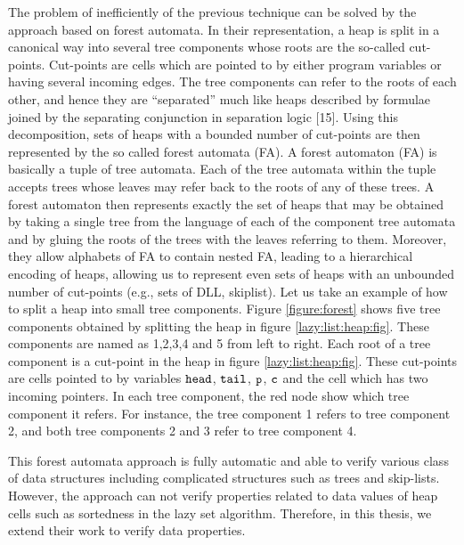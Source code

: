 The problem of inefficiently of the previous technique can be solved by the approach based on forest automata.  In their  representation, a heap is split in a canonical way into several tree components whose roots are the so-called cut-points. Cut-points are cells which are pointed to by either program variables or having several incoming edges. The tree components can refer to the roots of each other, and hence they are “separated” much like heaps described by formulae joined by the separating conjunction in separation logic [15].  Using this decomposition, sets of heaps with a bounded number of cut-points are then  represented by the  so called forest automata (FA). A forest automaton (FA)  is basically a tuple of tree automata. Each of the tree
automata within the tuple accepts trees whose leaves may refer back to the
roots of any of these trees. A forest automaton then represents exactly the set
of heaps that may be obtained by taking a single tree from the language of each
of the component tree automata and by gluing the roots of the trees with the
leaves referring to them. 
 Moreover, they allow alphabets of FA to contain nested FA, leading to a hierarchical encoding of heaps, allowing us to represent even sets of heaps with an unbounded number of cut-points (e.g., sets of DLL, skiplist). 
Let us take an example of how to split a heap into small tree components. Figure \ref{figure:forest} shows five tree components obtained by splitting the heap in figure \ref{lazy:list:heap:fig}. These components are named as 1,2,3,4 and 5 from left to right. Each root of a tree component is a cut-point in the heap in figure \ref{lazy:list:heap:fig}. These cut-points are cells pointed to by variables $\tt head$, $\tt tail$,  $\tt p$,  $\tt c$ and the cell which has two incoming pointers. In each tree component, the red node show which  tree component it refers. For instance, the tree component 1 refers to tree component 2, and both tree components 2 and 3 refer to tree component 4.

This forest automata approach is fully automatic and able to verify various class  of data structures  including complicated structures such as trees and skip-lists.  However, the approach can not verify properties related to data values of heap cells such as sortedness in the lazy set algorithm. Therefore, in this thesis, we extend their work to verify data properties. 

